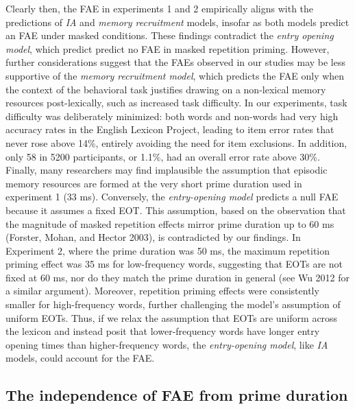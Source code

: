 \documentclass[
]{interact}
\begin{document}
Clearly then, the FAE in experiments 1 and 2 empirically aligns with the
predictions of \emph{IA} and \emph{memory recruitment} models, insofar
as both models predict an FAE under masked conditions. These findings
contradict the \emph{entry opening model}, which predict predict no FAE
in masked repetition priming. However, further considerations suggest
that the FAEs observed in our studies may be less supportive of the
\emph{memory recruitment model}, which predicts the FAE only when the
context of the behavioral task justifies drawing on a non-lexical memory
resources post-lexically, such as increased task difficulty. In our
experiments, task difficulty was deliberately minimized: both words and
non-words had very high accuracy rates in the English Lexicon Project,
leading to item error rates that never rose above 14\%, entirely
avoiding the need for item exclusions. In addition, only 58 in 5200
participants, or 1.1\%, had an overall error rate above 30\%. Finally,
many researchers may find implausible the assumption that episodic
memory resources are formed at the very short prime duration used in
experiment 1 (33 ms). Conversely, the \emph{entry-opening model}
predicts a null FAE because it assumes a fixed EOT. This assumption,
based on the observation that the magnitude of masked repetition effects
mirror prime duration up to 60 ms (Forster, Mohan, and Hector 2003), is
contradicted by our findings. In Experiment 2, where the prime duration
was 50 ms, the maximum repetition priming effect was 35 ms for
low-frequency words, suggesting that EOTs are not fixed at 60 ms, nor do
they match the prime duration in general (see Wu 2012 for a similar
argument). Moreover, repetition priming effects were consistently
smaller for high-frequency words, further challenging the model's
assumption of uniform EOTs. Thus, if we relax the assumption that EOTs
are uniform across the lexicon and instead posit that lower-frequency
words have longer entry opening times than higher-frequency words, the
\emph{entry-opening model}, like \emph{IA} models, could account for the
FAE.

\subsection{The independence of FAE from prime
duration}\label{the-independence-of-fae-from-prime-duration}
\end{document}

